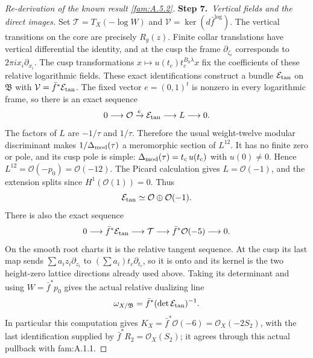 \documentclass[11pt,a4paper]{article}
\theoremstyle{plain}
\theoremstyle{definition}
\begin{document}
\begin{proof}[Re-derivation of the known result \ref{fam:A.5.2}]
\par\smallskip\noindent\textbf{Step 7.}\ \emph{Vertical fields and the direct images.}
Set $\mathcal T=T_X(-\log W)$ and
$\mathcal V=\ker(d\bar f^{\log})$.
The vertical transitions on the core are precisely $R_g(z)$.
Finite collar translations have vertical differential the identity,
and at the cusp the frame $\partial_{\zeta_i}$ corresponds to
$2\pi i x_i\partial_{x_i}$. The cusp transformations
$x\mapsto u(t_c)t_c^{B_0\lambda}x$ fix the coefficients of these
relative logarithmic fields. These exact identifications construct
a bundle $\mathcal E_{\rm tan}$ on $\mathfrak B$ with
$\mathcal V=\bar f^*\mathcal E_{\rm tan}$.
The fixed vector $e=(0,1)^t$ is nonzero in every logarithmic frame,
so there is an exact sequence
\[
 0\longrightarrow\mathcal O\xrightarrow{e}\mathcal E_{\rm tan}
 \longrightarrow L\longrightarrow0.
\]
The factors of $L$ are $-1/\tau$ and $1/\tau$. Therefore the usual
weight-twelve modular discriminant makes $1/\Delta_{\rm mod}(\tau)$ a
meromorphic section of $L^{12}$. It has no finite zero or pole,
and its cusp pole is simple: $\Delta_{\rm mod}(\tau)=t_c\,u(t_c)$ with
$u(0)\ne0$. Hence $L^{12}=\mathcal O(-p_0)=\mathcal O(-12)$.
The Picard calculation gives $L=\mathcal O(-1)$, and the extension
splits since $H^1(\mathcal O(1))=0$. Thus
\[
 \mathcal E_{\rm tan}\simeq\mathcal O\oplus\mathcal O(-1).
\]
There is also the exact sequence
\begin{equation}\label{fam:eq:ab-log-tangent}
 0\longrightarrow\bar f^*\mathcal E_{\rm tan}\longrightarrow\mathcal T
 \longrightarrow\bar f^*\mathcal O(-5)\longrightarrow0.
\end{equation}
On the smooth root charts it is the relative tangent sequence. At the
cusp its last map sends $\sum a_i z_i\partial_{z_i}$ to
$(\sum a_i)t_c\partial_{t_c}$, so it is onto and its kernel is the
two height-zero lattice directions already used above. Taking its
determinant and using $W=\bar f^*p_0$ gives the actual relative
dualizing line
\begin{equation}\label{fam:eq:ab-relative-dualizing}
 \omega_{X/\mathfrak B}=\bar f^*(\det\mathcal E_{\rm tan})^{-1}.
\end{equation}
In particular this computation gives
$K_X=\bar f^*\mathcal O(-6)=\mathcal O_X(-2S_2)$, with the last
identification supplied by $\bar f^*R_2=\mathcal O_X(S_2)$;
it agrees through this actual pullback with fam:A.1.1.


\end{proof}
\end{document}
